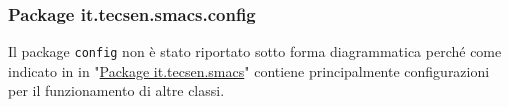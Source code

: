 \subsubsection{Package it.tecsen.smacs.config}
\label{subsubsubsec:it-tecsen-smacs-config}

Il package \texttt{config} non è stato riportato sotto forma diagrammatica perché come indicato in in "\hyperref[subsubsec:it-tecsen-smacs]{Package it.tecsen.smacs}" contiene principalmente configurazioni per il funzionamento di altre classi.